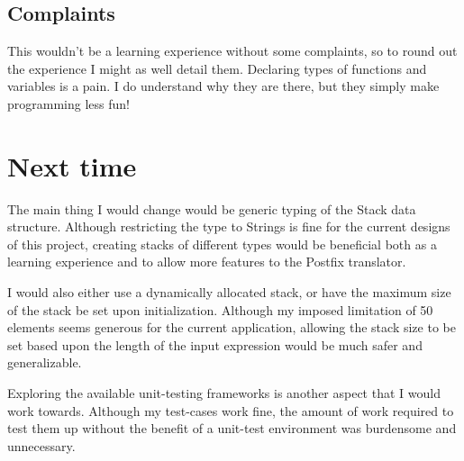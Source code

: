 \documentclass[a4paper,12pt]{article}
\begin{document}
\subsection{Complaints}
This wouldn't be a learning experience without some complaints, so to round out the experience I might as well detail them.  
Declaring types of functions and variables is a pain.  I do understand why they are there, but they simply make programming
less fun!


\section{Next time}
The main thing I would change would be generic typing of the Stack data structure.  Although restricting the type to 
Strings is fine for the current designs of this project, creating stacks of different types would be beneficial both as a learning experience
and to allow more features to the Postfix translator.

I would also either use a dynamically allocated stack, or have the maximum size of the stack be set upon initialization.  Although my 
imposed limitation of 50 elements seems generous for the current application, allowing the stack size to be set based upon 
the length of the input expression would be much safer and generalizable.

Exploring the available unit-testing frameworks is another aspect that I would work towards.  Although my test-cases work fine,
the amount of work required to test them up without the benefit of a unit-test environment was burdensome and unnecessary. 

\end{document}
